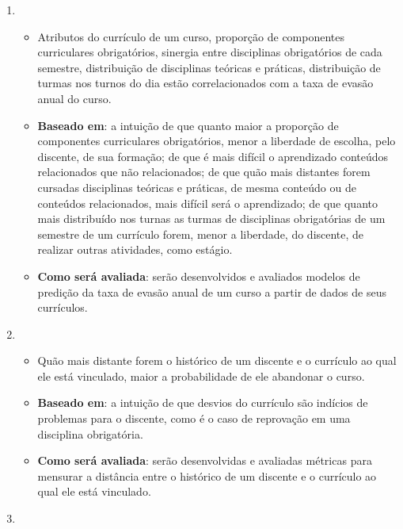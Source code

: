 \begin{enumerate}
\begin{itemize}
	\end{itemize}
	
\item 

	\begin{itemize}

		\item Atributos do currículo de um curso, proporção de componentes curriculares obrigatórios, sinergia entre disciplinas obrigatórios de cada semestre, distribuição de disciplinas teóricas e práticas, distribuição de turmas nos turnos do dia estão correlacionados com a taxa de evasão anual do curso.
		\item \textbf{Baseado em}: a intuição de que quanto maior a proporção de componentes curriculares obrigatórios, menor a liberdade de escolha, pelo discente, de sua formação; de que é mais difícil o aprendizado conteúdos relacionados que não relacionados; de que quão mais distantes forem cursadas disciplinas teóricas e práticas, de mesma conteúdo ou de conteúdos relacionados, mais difícil será o aprendizado; de que quanto mais distribuído nos turnas as turmas de disciplinas obrigatórias de um semestre de um currículo forem, menor a liberdade, do discente, de realizar outras atividades, como estágio.
		\item \textbf{Como será avaliada}: serão desenvolvidos e avaliados modelos de predição da taxa de evasão anual de um curso a partir de dados de seus currículos.

	\end{itemize}
	
\item 

	\begin{itemize}

		\item Quão mais distante forem o histórico de um discente e o currículo ao qual ele está vinculado, maior a probabilidade de ele abandonar o curso.
		\item \textbf{Baseado em}: a intuição de que desvios do currículo são indícios de problemas para o discente, como é o caso de reprovação em uma disciplina obrigatória.
		\item \textbf{Como será avaliada}: serão desenvolvidas e avaliadas métricas para mensurar a distância entre o histórico de um discente e o currículo ao qual ele está vinculado.

	\end{itemize}
	
\item


\end{enumerate}
